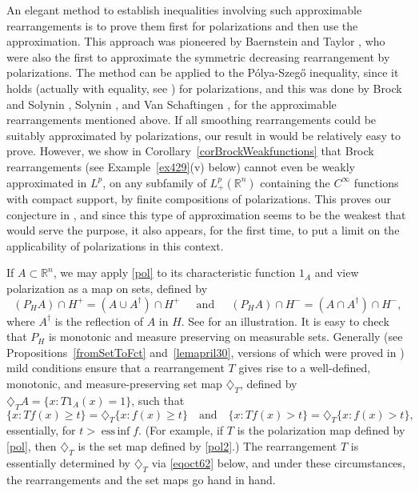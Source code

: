 \documentclass[12pt,reqno]{amsart}
\DeclareMathOperator*{\essinf}{ess\,inf}
\newcommand{\R}{{\mathbb R}}
\newcommand{\di}{\diamondsuit}
\numberwithin{equation}{section}
\begin{document}
An elegant method to establish inequalities involving such approximable rearrangements is to prove them first for polarizations and then use the approximation.  This approach was pioneered by Baernstein and Taylor \cite[Section~2]{BT}, who were also the first to approximate the symmetric decreasing rearrangement by polarizations.  The method can be applied to the P\'olya-Szeg\H{o} inequality, since it holds (actually with equality, see \cite[Proposition~3.12]{Baer}) for polarizations, and this was done by Brock and Solynin \cite[Theorem~8.2]{BS}, Solynin \cite[Theorem~10.2]{Sol1}, and Van Schaftingen \cite[Section~6]{VS1}, for the approximable rearrangements mentioned above.  If all smoothing rearrangements could be suitably approximated by polarizations, our result in \cite{BGGK2} would be relatively easy to prove.  However, we show in Corollary~\ref{corBrockWeakfunctions} that Brock rearrangements (see Example~\ref{ex429}(v) below) cannot even be weakly approximated in $L^p$, on any subfamily of $L^p_+(\R^n)$ containing the $C^{\infty}$ functions with compact support, by finite compositions of polarizations. This proves our conjecture in \cite[p.~6]{BGGK2}, and since this type of approximation seems to be the weakest that would serve the purpose, it also appears, for the first time, to put a limit on the applicability of polarizations in this context.

If $A\subset \R^n$, we may apply \eqref{pol} to its characteristic function $1_A$ and view polarization as a map on sets, defined by
\begin{equation}\label{pol2}
(P_HA)\cap H^+=\left(A\cup A^{\dagger}\right)\cap H^+~~\quad{\text{and}}~~\quad
(P_HA)\cap H^-=\left(A\cap A^{\dagger}\right)\cap H^-,
\end{equation}
where $A^{\dagger}$ is the reflection of $A$ in $H$. See \cite[Figure~1(a)]{BF} for an illustration. It is easy to check that $P_H$ is monotonic and measure preserving on measurable sets. Generally (see Propositions~\ref{fromSetToFct} and~\ref{lemapril30}, versions of which were proved in \cite{BGGK1}) mild conditions ensure that a rearrangement $T$ gives rise to a well-defined, monotonic, and measure-preserving set map $\di_T$, defined by $\di_T A=\{x: T1_A(x)=1\}$, such that
$$
\{x: Tf(x)\ge t\}=\di_T\{x: f(x)\ge t\}\quad{\text{and}}\quad\{x: Tf(x)> t\}=\di_T\{x: f(x)> t\},
$$
essentially, for $t>\essinf f$. (For example, if $T$ is the polarization map defined by \eqref{pol}, then $\di_T$ is the set map defined by \eqref{pol2}.) The rearrangement $T$ is essentially determined by $\di_T$ via \eqref{eqoct62} below, and under these circumstances, the rearrangements and the set maps go hand in hand.
\end{document}

